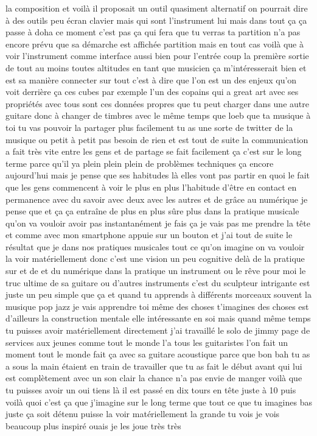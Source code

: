  la composition et voilà il proposait un outil quasiment alternatif on pourrait dire à des outils peu écran clavier mais qui sont l'instrument lui mais dans tout ça ça passe à doha ce moment c'est pas ça qui fera que tu verras ta partition n'a pas encore prévu que sa démarche est affichée partition mais en tout cas voilà que à voir l'instrument comme interface aussi bien pour l'entrée coup la première sortie de tout au moins toutes altitudes en tant que musicien ça m'intéresserait bien et est sa manière connecter sur tout c'est à dire que l'on est un des enjeux qu'on voit derrière ça ces cubes par exemple l'un des copains qui a great art avec ses propriétés avec tous sont ces données propres que tu peut charger dans une autre guitare donc à changer de timbres avec le même temps que loeb que ta musique à toi tu vas pouvoir la partager plus facilement tu as une sorte de twitter de la musique ou petit à petit pas besoin de rien et est tout de suite la communication a fait très vite entre les gens et de partage se fait facilement ça c'est sur le long terme parce qu'il ya plein plein plein de problèmes techniques ça encore aujourd'hui mais je pense que ses habitudes là elles vont pas partir en quoi le fait que les gens commencent à voir le plus en plus l'habitude d'être en contact en permanence avec du savoir avec deux avec les autres et de grâce au numérique je pense que et ça ça entraîne de plus en plus sûre plus dans la pratique musicale qu'on va vouloir avoir pas instantanément je fais ça je vais pas me prendre la tête et comme avec mon smartphone appuie sur un bouton et j'ai tout de suite le résultat que je dans nos pratiques musicales tout ce qu'on imagine on va vouloir la voir matériellement donc c'est une vision un peu cognitive delà de la pratique sur et de et du numérique dans la pratique un instrument ou le rêve pour moi le truc ultime de sa guitare ou d'autres instruments c'est du sculpteur intrigante est juste un peu simple que ça et quand tu apprends à différents morceaux souvent la musique pop jazz je vais apprendre toi même des choses t'imagines des choses est d'ailleurs la construction mentale elle intéressante en soi mais quand même temps tu puisses avoir matériellement directement j'ai travaillé le solo de jimmy page de services aux jeunes comme tout le monde l'a tous les guitaristes l'on fait un moment tout le monde fait ça avec sa guitare acoustique parce que bon bah tu as a sous la main étaient en train de travailler que tu as fait le début avant qui lui est complètement avec un son clair la chance n'a pas envie de manger voilà que tu puisses avoir un oui tiens là il est passé en dix tours en tête juste à 10 puis voilà quoi c'est ça que j'imagine sur le long terme que tout ce que tu imagines bas juste ça soit détenu puisse la voir matériellement la grande tu vois je vois beaucoup plus inspiré ouais je les joue très très 

